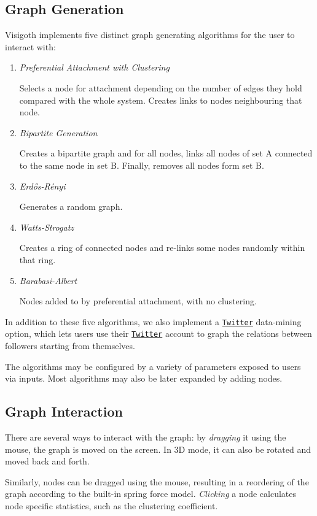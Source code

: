 \documentclass[a4paper,11pt,titlepage]{article}
\let\stdhref\href
\renewcommand{\href}[2]{\stdhref{#1}{\texttt{#2}}}
\newcommand{\Twitter}{\href{http://twitter.com}{Twitter} }
\begin{document}
\subsection{Graph Generation}
Visigoth implements five distinct graph generating algorithms for the user to interact with:
\begin{enumerate}
\item \emph{Preferential Attachment with Clustering}

Selects a node for attachment depending on the number of edges they hold 
compared with the whole system. Creates links to nodes neighbouring that node.

\item \emph{Bipartite Generation}

Creates a bipartite graph and for all nodes, links all nodes of set A connected to 
the same node in set B. Finally, removes all nodes form set B.

\item \emph{Erd\H{o}s-R\'{e}nyi}

Generates a random graph.

\item \emph{Watts-Strogatz}

Creates a ring of connected nodes and re-links some nodes randomly within that ring.

\item \emph{Barabasi-Albert}

Nodes added to by preferential attachment, with no clustering.

\end{enumerate}

In addition to these five algorithms, we also implement a \Twitter data-mining option, 
which lets users use their \Twitter account to graph the relations between followers 
starting from themselves.

The algorithms may be configured by a variety of parameters exposed to users 
via inputs. Most algorithms may also be later expanded by adding nodes.

\subsection{Graph Interaction}
There are several ways to interact with the graph: by \emph{dragging} it using the mouse,
 the graph is moved on the screen. In 3D mode, it can also be rotated and moved 
back and forth.

Similarly, nodes can be dragged using the mouse, resulting in a reordering of the 
graph according to the built-in spring force model. \emph{Clicking} a node calculates 
node specific statistics, such as the clustering coefficient.
\end{document}
